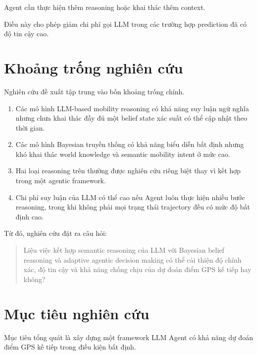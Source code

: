 \documentclass[11pt,a4paper]{article}
\begin{document}
	Agent cần thực hiện thêm reasoning hoặc khai thác thêm context.
	
	Điều này cho phép giảm chi phí gọi LLM trong các trường hợp prediction
	đã có độ tin cậy cao.
	
	\section{Khoảng trống nghiên cứu}
	
	Nghiên cứu đề xuất tập trung vào bốn khoảng trống chính.
	
	\begin{enumerate}
		
		\item
		Các mô hình LLM-based mobility reasoning có khả năng suy luận ngữ nghĩa
		nhưng chưa khai thác đầy đủ một belief state xác suất có thể cập nhật
		theo thời gian.
		
		\item
		Các mô hình Bayesian truyền thống có khả năng biểu diễn bất định nhưng
		khó khai thác world knowledge và semantic mobility intent ở mức cao.
		
		\item
		Hai loại reasoning trên thường được nghiên cứu riêng biệt thay vì kết
		hợp trong một agentic framework.
		
		\item
		Chi phí suy luận của LLM có thể cao nếu Agent luôn thực hiện nhiều bước
		reasoning, trong khi không phải mọi trạng thái trajectory đều có mức độ
		bất định cao.
		
	\end{enumerate}
	
	Từ đó, nghiên cứu đặt ra câu hỏi:
	
	\begin{quote}
		Liệu việc kết hợp semantic reasoning của LLM với Bayesian belief reasoning
		và adaptive agentic decision making có thể cải thiện độ chính xác,
		độ tin cậy và khả năng chống chịu của dự đoán điểm GPS kế tiếp hay không?
	\end{quote}
	
	\section{Mục tiêu nghiên cứu}
	
	Mục tiêu tổng quát là xây dựng một framework LLM Agent có khả năng dự đoán
	điểm GPS kế tiếp trong điều kiện bất định.
	
\end{document}
